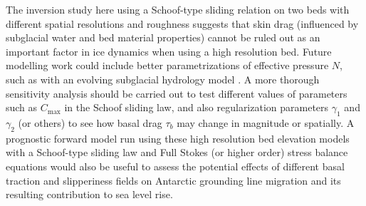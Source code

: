 The inversion study here using a Schoof-type sliding relation on two beds with different spatial resolutions and roughness suggests that skin drag (influenced by subglacial water and bed material properties) cannot be ruled out as an important factor in ice dynamics when using a high resolution bed.
Future modelling work could include better parametrizations of effective pressure $N$, such as with an evolving subglacial hydrology model \citep[e.g.][]{SommersSHAKTISubglacialHydrology2018}.
A more thorough sensitivity analysis should be carried out to test different values of parameters such as $C_{\text{max}}$ in the Schoof sliding law, and also regularization parameters $\gamma_1$ and $\gamma_2$ (or others) to see how basal drag $\tau_b$ may change in magnitude or spatially.
A prognostic forward model run using these high resolution bed elevation models with a Schoof-type sliding law and Full Stokes (or higher order) stress balance equations would also be useful to assess the potential effects of different basal traction and slipperiness fields on Antarctic grounding line migration and its resulting contribution to sea level rise.
